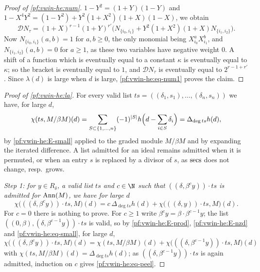 \begin{proof}[Proof of \cref{pf:vwin-he:num}]
$1-Y^2=(1+Y)(1-Y)$ and $1-X^4Y^2=(1-Y^2)+Y^2(1+X^2)(1+X)(1-X)$, we obtain
\[
 \mathcal DN_\tau=(1+X)^{r-1}(1+Y)^{r'}\bigl(N_{\{i_0,i_1\}}+Y^2(1+X^2)(1+X)N_{\{i_1,i_2\}}\bigr).
\]
Now $N_{\{i_0,i_1\}}(a,b)=1$ for $a,b\ge0$, the only monomial being $X_{i_0}^aX_{i_1}^b$, and
$N_{\{i_1,i_2\}}(a,b)=0$ for $a\ge1$, as these two variables have negative weight $0$. A shift of a function which is
eventually equal to a constant $\kappa$ is eventually equal to $\kappa$; so the bracket is eventually equal to $1$, and
$\mathcal DN_\tau$ is eventually equal to $2^{r-1+r'}$. Since $\lambda(d)$ is large when $d$ is large,
\eqref{pf:vwin-he:eq-num1} proves the claim.
\end{proof}

\begin{proof}[Proof of \cref{pf:vwin-he:la}]
For every valid list $ts=((\delta_1,s_1),\dots,(\delta_n,s_n))$ we have, for large $d$,
\begin{equation}\label{pf:vwin-he:eq-small}
 \chi(ts,M/\beta M)(d)=\sum_{S\subset\{1,\dots,n\}}(-1)^{|S|}h\Bigl(d-\sum_{i\in S}\delta_i\Bigr)=\Delta_{\deg ts}h(d),
\end{equation}
by \ref{pf:vwin-he:E-small} applied to the graded module $M/\beta M$ and by expanding the iterated difference. A list
admitted for an ideal remains admitted when it is permuted, or when an entry $s$ is replaced by a divisor of $s$, as
$\operatorname{secs}$ does not change, resp.\ grows.

\emph{Step 1: for $y\in R_\delta$, a valid list $ts$ and $c\in\N$ such that $((\delta,\beta^cy))\cdot ts$ is admitted
for $\operatorname{Ann}(M)$, we have for large $d$}
\begin{equation}\label{pf:vwin-he:eq-peel}
 \chi\bigl(((\delta,\beta^cy))\cdot ts,M\bigr)(d)=c\,\Delta_{\deg ts}h(d)+\chi\bigl(((\delta,y))\cdot ts,M\bigr)(d).
\end{equation}
For $c=0$ there is nothing to prove. For $c\ge1$ write $\beta^cy=\beta\cdot\beta^{c-1}y$; the list
$((0,\beta),(\delta,\beta^{c-1}y))\cdot ts$ is valid, so by \ref{pf:vwin-he:E-prod}, \ref{pf:vwin-he:E-nzd} and
\eqref{pf:vwin-he:eq-small}, for large $d$,
\[
 \chi\bigl(((\delta,\beta^cy))\cdot ts,M\bigr)(d)=\chi(ts,M/\beta M)(d)+\chi\bigl(((\delta,\beta^{c-1}y))\cdot ts,M\bigr)(d)
\]
with $\chi(ts,M/\beta M)(d)=\Delta_{\deg ts}h(d)$; as $((\delta,\beta^{c-1}y))\cdot ts$ is again admitted, induction on
$c$ gives \eqref{pf:vwin-he:eq-peel}.


\end{proof}

